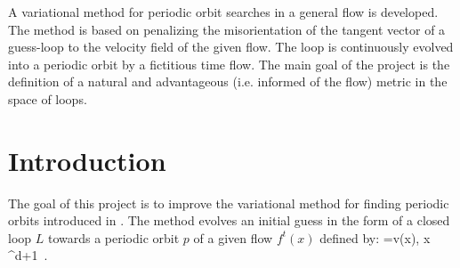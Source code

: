


%
%
%
%
% 				
%
 A variational method for periodic orbit searches in a general flow is developed.
 The method is based on penalizing the misorientation of the tangent vector of a guess-loop to
 the velocity field of the given flow. The loop is continuously evolved into a periodic orbit
 by a fictitious time flow. The main goal of the project is the definition of a natural and
 advantageous (i.e. informed of the flow) metric in the space of loops.

%

\section{Introduction}

 The goal of this project is to improve the variational method
 for finding periodic orbits introduced in .
 The method evolves an initial guess in the form of a closed loop $L$
 towards a periodic orbit $p$ of a given flow $f^t(x)$ defined by:
 \beq
    =v(x),\; x \in {}^{d+1}\, .
    \label{eq:flow}
 \eeq

